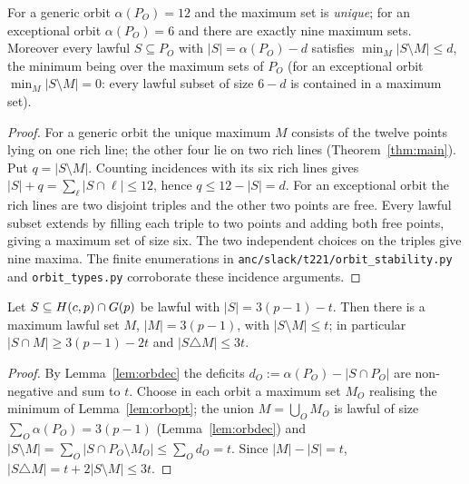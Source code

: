 \begin{lemma}\label{lem:orbopt}
For a generic orbit $\alpha(P_O)=12$ and the maximum set is \emph{unique}; for an exceptional orbit $\alpha(P_O)=6$ and there are exactly
nine maximum sets.  Moreover every lawful $S\subseteq P_O$ with $|S|=\alpha(P_O)-d$ satisfies $\min_M|S\setminus M|\le d$, the minimum
being over the maximum sets of $P_O$ (for an exceptional orbit $\min_M|S\setminus M|=0$: every lawful subset of size $6-d$ is contained in
a maximum set).
\end{lemma}
\begin{proof}
For a generic orbit the unique maximum $M$ consists of the twelve points lying on one rich line; the other four lie on two rich lines (Theorem~\ref{thm:main}).
Put $q=|S\setminus M|$.  Counting incidences with its six rich lines gives
$|S|+q=\sum_\ell|S\cap\ell|\le12$, hence $q\le12-|S|=d$.
For an exceptional orbit the rich lines are two disjoint triples and the other two points are free.
Every lawful subset extends by filling each triple to two points and adding both free points, giving a maximum set of size six.
The two independent choices on the triples give nine maxima.
The finite enumerations in \texttt{anc/slack/t221/orbit\_stability.py} and \texttt{orbit\_types.py} corroborate these incidence arguments.
\end{proof}

\begin{proposition}[stability]\label{prop:stability}
Let $S\subseteq H(c,p)\cap G(p)$ be lawful with $|S|=3(p-1)-t$.  Then there is a maximum lawful set $M$,
$|M|=3(p-1)$, with $|S\setminus M|\le t$; in particular $|S\cap M|\ge3(p-1)-2t$ and $|S\triangle M|\le3t$.
\end{proposition}
\begin{proof}
By Lemma~\ref{lem:orbdec} the deficits $d_O:=\alpha(P_O)-|S\cap P_O|$ are non-negative and sum to $t$.  Choose in each orbit a maximum
set $M_O$ realising the minimum of Lemma~\ref{lem:orbopt}; the union $M=\bigcup_OM_O$ is lawful of size $\sum_O\alpha(P_O)=3(p-1)$
(Lemma~\ref{lem:orbdec}) and $|S\setminus M|=\sum_O|S\cap P_O\setminus M_O|\le\sum_Od_O=t$.  Since $|M|-|S|=t$, $|S\triangle M|=t+2|S\setminus M|\le3t$.
\end{proof}

